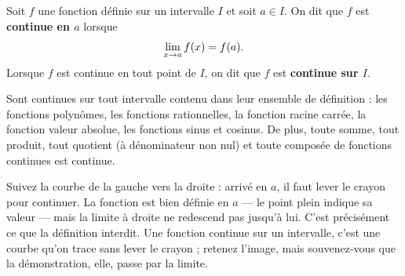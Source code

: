 \begin{definition}
Soit $f$ une fonction définie sur un intervalle $I$ et soit $a \in I$. On dit
que $f$ est \textbf{continue en $a$} lorsque
\[
  \limx{a} f(x) = f(a).
\]
Lorsque $f$ est continue en tout point de $I$, on dit que $f$ est
\textbf{continue sur $I$}.
\end{definition}


\begin{propriete}
Sont continues sur tout intervalle contenu dans leur ensemble de définition :
les fonctions polynômes, les fonctions rationnelles, la fonction racine
carrée, la fonction valeur absolue, les fonctions sinus et cosinus. De plus,
toute somme, tout produit, tout quotient (à dénominateur non nul) et toute
composée de fonctions continues est continue.
\end{propriete}

\begin{visualisation}
\begin{center}
\end{center}

Suivez la courbe de la gauche vers la droite : arrivé en $a$, il faut lever le
crayon pour continuer. La fonction est bien définie en $a$ — le point plein
indique sa valeur — mais la limite à droite ne redescend pas jusqu'à lui.
C'est précisément ce que la définition interdit. Une fonction continue sur un
intervalle, c'est une courbe qu'on trace sans lever le crayon ; retenez
l'image, mais souvenez-vous que la démonstration, elle, passe par la limite.
\end{visualisation}

